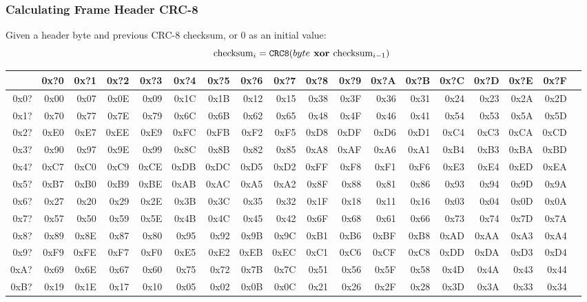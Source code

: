 \subsubsection{Calculating Frame Header CRC-8}
\label{flac:verify_crc8}
Given a header byte and previous CRC-8 checksum,
or 0 as an initial value:
\begin{equation*}
\text{checksum}_i = \texttt{CRC8}(byte\textbf{ xor }\text{checksum}_{i - 1})
\end{equation*}
\begin{table}[h]
{\ttfamily
\begin{tabular}{|r||r|r|r|r|r|r|r|r|r|r|r|r|r|r|r|r|r|}
\hline
 & 0x?0 & 0x?1 & 0x?2 & 0x?3 & 0x?4 & 0x?5 & 0x?6 & 0x?7 & 0x?8 & 0x?9 & 0x?A & 0x?B & 0x?C & 0x?D & 0x?E & 0x?F \\
\hline
0x0? & 0x00 & 0x07 & 0x0E & 0x09 & 0x1C & 0x1B & 0x12 & 0x15 & 0x38 & 0x3F & 0x36 & 0x31 & 0x24 & 0x23 & 0x2A & 0x2D \\
0x1? & 0x70 & 0x77 & 0x7E & 0x79 & 0x6C & 0x6B & 0x62 & 0x65 & 0x48 & 0x4F & 0x46 & 0x41 & 0x54 & 0x53 & 0x5A & 0x5D \\
0x2? & 0xE0 & 0xE7 & 0xEE & 0xE9 & 0xFC & 0xFB & 0xF2 & 0xF5 & 0xD8 & 0xDF & 0xD6 & 0xD1 & 0xC4 & 0xC3 & 0xCA & 0xCD \\
0x3? & 0x90 & 0x97 & 0x9E & 0x99 & 0x8C & 0x8B & 0x82 & 0x85 & 0xA8 & 0xAF & 0xA6 & 0xA1 & 0xB4 & 0xB3 & 0xBA & 0xBD \\
0x4? & 0xC7 & 0xC0 & 0xC9 & 0xCE & 0xDB & 0xDC & 0xD5 & 0xD2 & 0xFF & 0xF8 & 0xF1 & 0xF6 & 0xE3 & 0xE4 & 0xED & 0xEA \\
0x5? & 0xB7 & 0xB0 & 0xB9 & 0xBE & 0xAB & 0xAC & 0xA5 & 0xA2 & 0x8F & 0x88 & 0x81 & 0x86 & 0x93 & 0x94 & 0x9D & 0x9A \\
0x6? & 0x27 & 0x20 & 0x29 & 0x2E & 0x3B & 0x3C & 0x35 & 0x32 & 0x1F & 0x18 & 0x11 & 0x16 & 0x03 & 0x04 & 0x0D & 0x0A \\
0x7? & 0x57 & 0x50 & 0x59 & 0x5E & 0x4B & 0x4C & 0x45 & 0x42 & 0x6F & 0x68 & 0x61 & 0x66 & 0x73 & 0x74 & 0x7D & 0x7A \\
0x8? & 0x89 & 0x8E & 0x87 & 0x80 & 0x95 & 0x92 & 0x9B & 0x9C & 0xB1 & 0xB6 & 0xBF & 0xB8 & 0xAD & 0xAA & 0xA3 & 0xA4 \\
0x9? & 0xF9 & 0xFE & 0xF7 & 0xF0 & 0xE5 & 0xE2 & 0xEB & 0xEC & 0xC1 & 0xC6 & 0xCF & 0xC8 & 0xDD & 0xDA & 0xD3 & 0xD4 \\
0xA? & 0x69 & 0x6E & 0x67 & 0x60 & 0x75 & 0x72 & 0x7B & 0x7C & 0x51 & 0x56 & 0x5F & 0x58 & 0x4D & 0x4A & 0x43 & 0x44 \\
0xB? & 0x19 & 0x1E & 0x17 & 0x10 & 0x05 & 0x02 & 0x0B & 0x0C & 0x21 & 0x26 & 0x2F & 0x28 & 0x3D & 0x3A & 0x33 & 0x34 \\

\end{tabular}}
\end{table}
